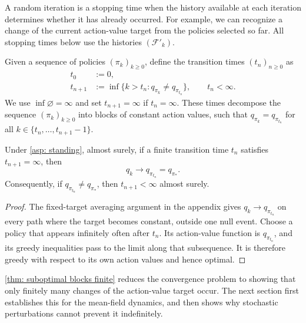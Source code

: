 A random iteration is a stopping time when the history available at each iteration determines whether it has already occurred. For example, we can recognize a change of the current action-value target from the policies selected so far. All stopping times below use the histories $(\mathcal F'_k)$.

\begin{definition}
\label{def: transition times}
Given a sequence of policies $(\pi_k)_{k \ge 0}$,
define the transition times $(t_n)_{n \ge 0}$ as
\begin{align*}
t_0 &:= 0 ,
\\
t_{n+1} &:= \inf\{k>t_n : q_{\pi_k} \neq q_{\pi_{t_n}} \},\qquad t_n<\infty.
\end{align*}
We use $\inf\varnothing=\infty$ and set $t_{n+1}=\infty$ if $t_n=\infty$.
These times decompose the sequence $(\pi_k)_{k \ge 0}$ into blocks of constant action values, such that $q_{\pi_k} = q_{\pi_{t_n}}$ for all $k \in \{t_n, \dots, t_{n+1}-1 \}$.
\end{definition}

\begin{lemma}
\label{thm: suboptimal blocks finite}
Under \autoref{asp: standing}, almost surely, if a finite transition time $t_n$ satisfies $t_{n+1}=\infty$, then
\[
q_k\longrightarrow q_{\pi_{t_n}}=q_{\pi_*}.
\]
Consequently, if $q_{\pi_{t_n}}\ne q_{\pi_*}$, then $t_{n+1}<\infty$ almost surely.
\end{lemma}
\begin{proof}
The fixed-target averaging argument in the appendix gives $q_k\to q_{\pi_{t_n}}$ on every path where the target becomes constant, outside one null event.
Choose a policy that appears infinitely often after $t_n$. Its action-value function is $q_{\pi_{t_n}}$, and its greedy inequalities pass to the limit along that subsequence. It is therefore greedy with respect to its own action values and hence optimal.
\end{proof}










\autoref{thm: suboptimal blocks finite} reduces the convergence problem to showing that only finitely many changes of the action-value target occur. The next section first establishes this for the mean-field dynamics, and then shows why stochastic perturbations cannot prevent it indefinitely.




































